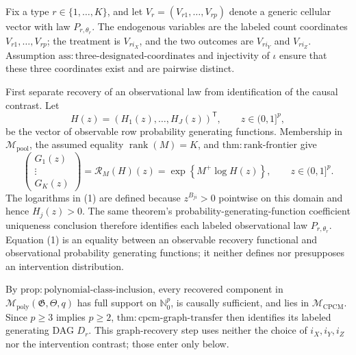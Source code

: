 Fix a type \(r\in\{1,\ldots,K\}\), and let \(V_r=(V_{r1},\ldots,V_{rp})\) denote a generic cellular vector with law \(P_{r,\theta_r}\).  The endogenous variables are the labeled count coordinates \(V_{r1},\ldots,V_{rp}\); the treatment is \(V_{r i_X}\), and the two outcomes are \(V_{r i_Y}\) and \(V_{r i_Z}\).  Assumption \(\mathrm{ass{:}three\text{-}designated\text{-}coordinates}\) and injectivity of \(\iota\) ensure that these three coordinates exist and are pairwise distinct.

First separate recovery of an observational law from identification of the causal contrast.  Let
\[
H(z)=(H_1(z),\ldots,H_J(z))^{\mathsf T},\qquad z\in(0,1]^p,
\]
be the vector of observable row probability generating functions.  Membership in \(\mathcal M_{\mathrm{pool}}\), the assumed equality \(\operatorname{rank}(M)=K\), and \(\mathrm{thm{:}rank\text{-}frontier}\) give
\[
\begin{pmatrix}G_1(z)\\ \vdots\\ G_K(z)\end{pmatrix}
=\mathscr R_M(H)(z)
=\exp\!\left\{M^+\log H(z)\right\},
\qquad z\in(0,1]^p. \tag{1}
\]
The logarithms in (1) are defined because \(z^{B_{ji}}>0\) pointwise on this domain and hence \(H_j(z)>0\).  The same theorem's probability-generating-function coefficient uniqueness conclusion therefore identifies each labeled observational law \(P_{r,\theta_r}\).  Equation (1) is an equality between an observable recovery functional and observational probability generating functions; it neither defines nor presupposes an intervention distribution.

By \(\mathrm{prop{:}polynomial\text{-}class\text{-}inclusion}\), every recovered component in \(\mathcal M_{\mathrm{poly}}(\mathfrak G,\Theta,q)\) has full support on \(\mathbb N_0^p\), is causally sufficient, and lies in \(\mathcal M_{\mathrm{CPCM}}\).  Since \(p\geq3\) implies \(p\geq2\), \(\mathrm{thm{:}cpcm\text{-}graph\text{-}transfer}\) then identifies its labeled generating DAG \(D_r\).  This graph-recovery step uses neither the choice of \(i_X,i_Y,i_Z\) nor the intervention contrast; those enter only below.


